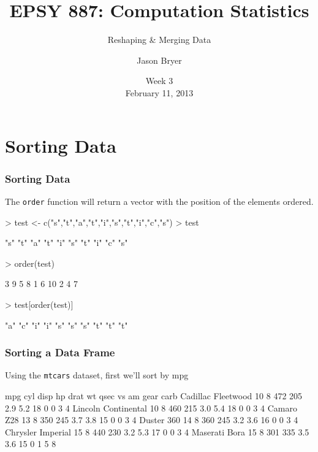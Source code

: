 \documentclass[10pt,slidestop,mathserif,c]{beamer}
\title{EPSY 887: Computation Statistics}
\subtitle{Reshaping \& Merging Data}
\author[Jason Bryer]{Jason Bryer}
\institute[Jason.Bryer.org]{\url{http://github.com/jbryer/CompStats}\\\href{mailto:jason@bryer.org}{jason@bryer.org}}
\date[Feb 11, 2013]{Week 3\\February 11, 2013}
\begin{document}


\frame{\titlepage}

\section{Sorting Data}

\begin{frame}
	\frametitle{Sorting Data}
	The \texttt{order} function will return a vector with the position of the elements ordered.
\begin{Schunk}
\begin{Sinput}
> test <- c("s","t","a","t","i","s","t","i","c","s")
> test
\end{Sinput}
\begin{Soutput}
 [1] "s" "t" "a" "t" "i" "s" "t" "i" "c" "s"
\end{Soutput}
\begin{Sinput}
> order(test)
\end{Sinput}
\begin{Soutput}
 [1]  3  9  5  8  1  6 10  2  4  7
\end{Soutput}
\begin{Sinput}
> test[order(test)]
\end{Sinput}
\begin{Soutput}
 [1] "a" "c" "i" "i" "s" "s" "s" "t" "t" "t"
\end{Soutput}
\end{Schunk}
\end{frame}

\begin{frame}
	\frametitle{Sorting a Data Frame}
	Using the \texttt{mtcars} dataset, first we'll sort by mpg

\begin{Schunk}
\begin{Soutput}
                    mpg cyl disp  hp drat  wt qsec vs am gear carb
Cadillac Fleetwood   10   8  472 205  2.9 5.2   18  0  0    3    4
Lincoln Continental  10   8  460 215  3.0 5.4   18  0  0    3    4
Camaro Z28           13   8  350 245  3.7 3.8   15  0  0    3    4
Duster 360           14   8  360 245  3.2 3.6   16  0  0    3    4
Chrysler Imperial    15   8  440 230  3.2 5.3   17  0  0    3    4
Maserati Bora        15   8  301 335  3.5 3.6   15  0  1    5    8
\end{Soutput}
\end{Schunk}
\end{frame}
\end{document}
